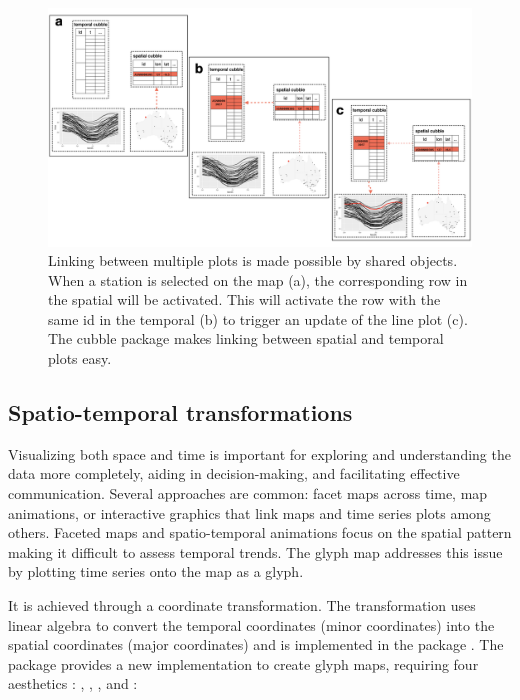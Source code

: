\documentclass[
  shortnames]{jss}
\begin{document}
\begin{CodeChunk}
\begin{figure}

{\centering \includegraphics[width=1\linewidth,height=0.35\textheight]{figures/diagram-keynotes/diagram-keynotes.002} 

}

\caption{Linking between multiple plots is made possible by shared  objects. When a station is selected on the map (a), the corresponding row in the spatial  will be activated. This will activate the row with the same id in the temporal  (b) to trigger an update of the line plot (c). The cubble package makes linking between spatial and temporal plots easy.}\label{fig:illu-interactive}
\end{figure}
\end{CodeChunk}

\hypertarget{st_transformation}{%
\subsection{Spatio-temporal transformations}\label{st_transformation}}

Visualizing both space and time is important for exploring and understanding the data more completely, aiding in decision-making, and facilitating effective communication. Several approaches are common: facet maps across time, map animations, or interactive graphics that link maps and time series plots among others. Faceted maps and spatio-temporal animations focus on the spatial pattern making it difficult to assess temporal trends. The glyph map \citep{Wickham2012-yr} addresses this issue by plotting time series onto the map as a glyph.

It is achieved through a coordinate transformation. The transformation uses linear algebra to convert the temporal coordinates (minor coordinates) into the spatial coordinates (major coordinates) and is implemented in the package  \citep{ggally}. The  package provides a new  implementation to create glyph maps,  requiring four aesthetics : , , , and :
\end{document}
